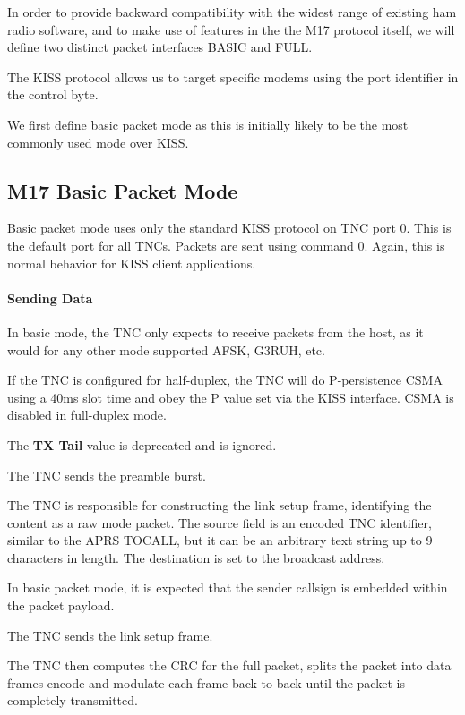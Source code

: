 \documentclass[a4paper,11pt,oneside]{article}
\begin{document}
In order to provide backward compatibility with the widest range of existing ham radio software, and to make use of features in the the M17 protocol itself, we will define two distinct packet interfaces BASIC and FULL.

The KISS protocol allows us to target specific modems using the port identifier in the control byte.

We first define basic packet mode as this is initially likely to be the most commonly used mode over KISS.

\subsection{M17 Basic Packet Mode}

Basic packet mode uses only the standard KISS protocol on TNC port 0. This is the default port for all TNCs. Packets are sent using command 0. Again, this is normal behavior for KISS client applications.

\paragraph{Sending Data}

In basic mode, the TNC only expects to receive packets from the host, as it would for any other mode supported AFSK, G3RUH, etc.

If the TNC is configured for half-duplex, the TNC will do P-persistence CSMA using a 40ms slot time and obey the P value set via the KISS interface. CSMA is disabled in full-duplex mode.

The \textbf{TX Tail} value is deprecated and is ignored.

The TNC sends the preamble burst.

The TNC is responsible for constructing the link setup frame, identifying the content as a raw mode packet. The source field is an encoded TNC identifier, similar to the APRS TOCALL, but it can be an arbitrary text string up to 9 characters in length. The destination is set to the broadcast address.

In basic packet mode, it is expected that the sender callsign is embedded within the packet payload.

The TNC sends the link setup frame.

The TNC then computes the CRC for the full packet, splits the packet into data frames encode and modulate each frame back-to-back until the packet is completely transmitted.
\end{document}
